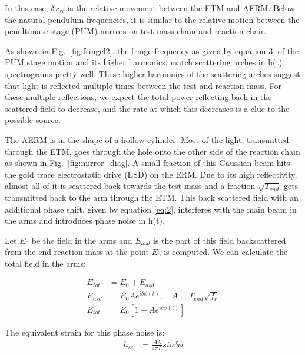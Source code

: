 \documentclass[12pt]{iopart}
\begin{document}
In this case, ${\delta x_{sc}}$ is the relative movement between the ETM and AERM. Below the natural pendulum frequencies, it is similar to the relative motion between the penultimate stage (PUM) mirrors on test mass chain and reaction chain.  


As shown in Fig.~\ref{fig:fringel2}. the fringe frequency as given by equation 3, of the PUM stage motion and its higher harmonics, match scattering arches in h(t) spectrograms pretty well. These higher harmonics of the scattering arches suggest that light is reflected multiple times between the test and reaction mass.  For these multiple reflections, we expect the total power reflecting back in the scattered field to decrease, and the rate at which this decreases is a clue to the possible source. 
\par
The AERM is in the shape of a hollow cylinder. Most of the light, transmitted through the ETM, goes through the hole onto the other side of the reaction chain as shown in Fig.~\ref{fig:mirror_diag}. A small fraction of this Gaussian beam hits the gold trace electrostatic drive (ESD) on the ERM. Due to its high reflectivity, almost all of it is scattered back towards the test mass and a fraction $\sqrt{T_{end}}$ gets transmitted back to the arm through the ETM. This back scattered field with an additional phase shift, given by equation \ref{eq:2}, interferes with the main beam in the arms and introduces phase noise in h(t).
\par
Let $E_{0}$ be the field in the arms and $E_{asd}$ is the part of this field backscattered from the end reaction mass at the point $E_{0}$ is computed. We can calculate the total field in the arms:

\begin{align}
    E_{tot} &= E_{0} + E_{asd} \label{eq:4} \\
    E_{asd} &= E_{0}Ae^{i{\delta}{\phi}(t)} ,\quad A = T_{end}\sqrt{f_{r}}  \label{eq:5} \\ 
    E_{tot} &= E_{0}[1 + Ae^{i{\delta}{\phi}(t)}]  \label{eq:6}
\end{align}


The equivalent strain for this phase noise is:
\begin{align}
    h_{sc} &= \frac{A{\lambda}}{4{\pi}L}sin{\delta}{\phi}  \label{eq:7}
\end{align}
\end{document}
